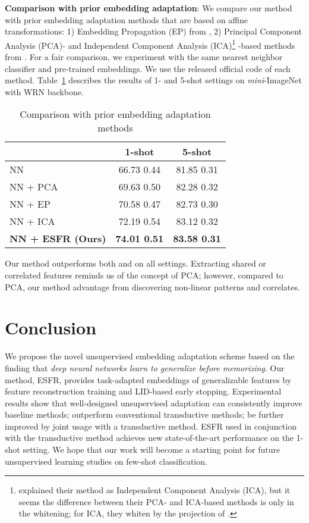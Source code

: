 \documentclass{article}
\begin{document}
\textbf{Comparison with prior embedding adaptation}:
We compare our method with prior embedding adaptation methods that are based on affine transformations: 1) Embedding Propagation (EP) from \citet{epnet}, 2) Principal Component Analysis (PCA)- and Independent Component Analysis (ICA)\footnote{\citet{TAFSSL} explained their method as Independent Component Analysis (ICA), but it seems the difference between their PCA- and ICA-based methods is only in the whitening; for ICA, they whiten by the projection of .} -based methods from \citet{TAFSSL}. For a fair comparison, we experiment with the same nearest neighbor classifier and pre-trained embeddings. We use the released official code of each method. Table~\ref{Table:PCA} describes the results of 1- and 5-shot settings on \textit{mini}-ImageNet with WRN backbone.
\begin{table}[ht]
	\vskip -0.15in
	\caption{Comparison with prior embedding adaptation methods}
	\label{Table:PCA}
	\begin{small}
		\begin{center}
			\begin{tabular}{lcc}
				\hline
				& \textbf{1-shot} & \textbf{5-shot} \\ \hline
				NN		       & 66.73  0.44          & 81.85  0.31          \\
				NN + PCA       & 69.63  0.50          & 82.28  0.32          \\
				NN + EP        & 70.58  0.47          & 82.73  0.30          \\
				NN + ICA       & 72.19  0.54          & 83.12  0.32          \\
				\rowcolor[HTML]{EFEFEF} 
				\textbf{NN + ESFR (Ours)} & \textbf{74.01  0.51} & \textbf{83.58  0.31}         \\ \hline
			\end{tabular}
		\end{center}
	\end{small}
	\vskip -0.15in
\end{table}

Our method outperforms both \citet{epnet} and \citet{TAFSSL} on all settings. Extracting shared or correlated features reminds us of the concept of PCA; however, compared to PCA, our method advantage from discovering non-linear patterns and correlates.  \section{Conclusion}
We propose the novel unsupervised embedding adaptation scheme based on the finding that \textit{deep neural networks learn to generalize before memorizing}.
Our method, ESFR, provides task-adapted embeddings of generalizable features by feature reconstruction training and LID-based early stopping.
Experimental results show that well-designed unsupervised adaptation can consistently improve baseline methods; outperform conventional transductive methods; be further improved by joint usage with a transductive method.
ESFR used in conjunction with the transductive method achieves new state-of-the-art performance on the 1-shot setting.
We hope that our work will become a starting point for future unsupervised learning studies on few-shot classification. 
\end{document}
